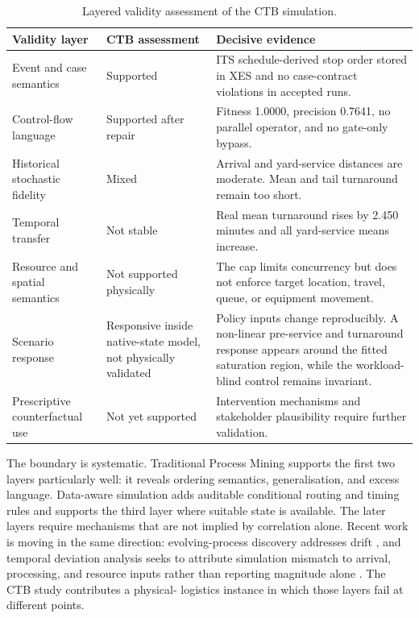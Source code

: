 \begin{table}[htbp]
\centering
\begin{tabularx}{\textwidth}{L{3.0cm}L{2.4cm}X}
\toprule
\textbf{Validity layer} & \textbf{CTB assessment} & \textbf{Decisive evidence} \\
\midrule
Event and case semantics & Supported & ITS schedule-derived stop order stored in XES and no case-contract violations in accepted runs. \\
Control-flow language & Supported after repair & Fitness 1.0000, precision 0.7641, no parallel operator, and no gate-only bypass. \\
Historical stochastic fidelity & Mixed & Arrival and yard-service distances are moderate. Mean and tail turnaround remain too short. \\
Temporal transfer & Not stable & Real mean turnaround rises by 2.450 minutes and all yard-service means increase. \\
Resource and spatial semantics & Not supported physically & The cap limits concurrency but does not enforce target location, travel, queue, or equipment movement. \\
Scenario response & Responsive inside native-state model, not physically validated & Policy inputs change reproducibly. A non-linear pre-service and turnaround response appears around the fitted saturation region, while the workload-blind control remains invariant. \\
Prescriptive counterfactual use & Not yet supported & Intervention mechanisms and stakeholder plausibility require further validation. \\
\bottomrule
\end{tabularx}
\caption{Layered validity assessment of the CTB simulation.}
\label{tab:validity_ladder}
\end{table}

The boundary is systematic. Traditional Process Mining supports the first two
layers particularly well: it reveals ordering semantics, generalisation, and
excess language. Data-aware simulation adds auditable conditional routing and
timing rules and supports the third layer where suitable state is available.
The later layers require mechanisms that are not implied by correlation alone.
Recent work is moving in the same direction: evolving-process discovery
addresses drift \cite{vinci2025onlinediscoverysimulationmodels}, and temporal
deviation analysis seeks to attribute simulation mismatch to arrival,
processing, and resource inputs rather than reporting magnitude alone
\cite{Wang2026TemporalDeviations}. The CTB study contributes a physical-
logistics instance in which those layers fail at different points.

